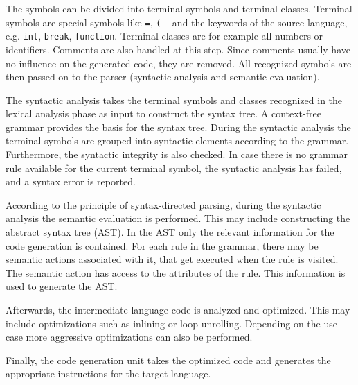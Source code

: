 The symbols can be divided into terminal symbols and terminal classes. Terminal symbols are special symbols like \texttt{=}, \texttt{(} \texttt{-} and the keywords of the source language, e.g. \texttt{int}, \texttt{break},  \texttt{function}. Terminal classes are for example all numbers or identifiers. Comments are also handled at this step. Since comments usually have no influence on the generated code, they are removed. All recognized symbols are then passed on to the parser (syntactic analysis and semantic evaluation). 



The syntactic analysis takes the terminal symbols and classes recognized in the lexical analysis phase as input to construct the syntax tree. A context-free grammar provides the basis for the syntax tree. During the syntactic analysis the terminal symbols are grouped into syntactic elements according to the grammar. Furthermore, the syntactic integrity is also checked. In case there is no grammar rule available for the current terminal symbol, the syntactic analysis has failed, and a syntax error is reported.


According to the principle of syntax-directed parsing, during the syntactic analysis the semantic evaluation is performed. This may include constructing the abstract syntax tree (AST). In the AST only the relevant information for the code generation is contained. For each rule in the grammar, there may be semantic actions associated with it, that get executed when the rule is visited. The semantic action has access to the attributes of the rule. This information is used to generate the AST.  


Afterwards, the intermediate language code is analyzed and optimized. This may include optimizations such as inlining or loop unrolling. Depending on the use case more aggressive optimizations can also be performed. 

Finally, the code generation unit takes the optimized code and generates the appropriate instructions for the target language. 